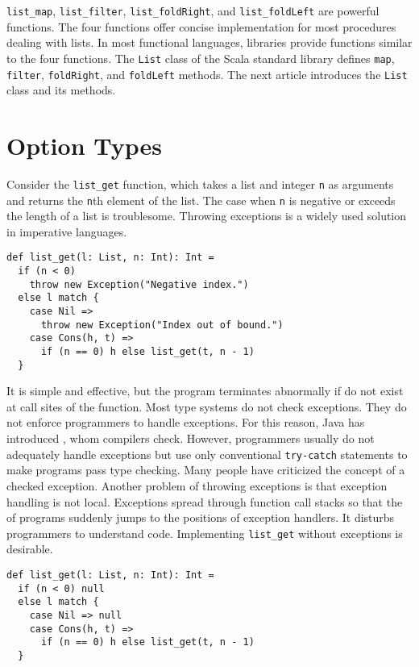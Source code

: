 \verb!list_map!, \verb!list_filter!, \verb!list_foldRight!, and
\verb!list_foldLeft! are powerful functions. The four functions offer concise
implementation for most procedures dealing with lists. In most functional
languages, libraries provide functions similar to the four functions. The
\verb!List! class of the Scala standard library defines \verb!map!,
\verb!filter!, \verb!foldRight!, and \verb!foldLeft! methods. The next article
introduces the \verb!List! class and its methods.

\section{Option Types}

Consider the \verb!list_get! function, which takes a list and integer \verb!n! as
arguments and returns the \verb!n!th element of the list. The case when \verb!n!
is negative or exceeds the length of a list is troublesome. Throwing exceptions
is a widely used solution in imperative languages.

\begin{verbatim}
def list_get(l: List, n: Int): Int =
  if (n < 0)
    throw new Exception("Negative index.")
  else l match {
    case Nil =>
      throw new Exception("Index out of bound.")
    case Cons(h, t) =>
      if (n == 0) h else list_get(t, n - 1)
  }
\end{verbatim}

It is simple and effective, but the program terminates abnormally if
 do not exist at call sites of the function. Most type
systems do not check exceptions. They do not enforce programmers to handle
exceptions. For this reason, Java has introduced , whom
compilers check. However, programmers usually do not adequately handle exceptions
but use only conventional \verb!try-catch! statements to make programs pass type
checking. Many people have criticized the concept of a checked exception. Another
problem of throwing exceptions is that exception handling is not local.
Exceptions spread through function call stacks so that the  of
programs suddenly jumps to the positions of exception handlers. It disturbs
programmers to understand code. Implementing \verb!list_get! without exceptions
is desirable.

\begin{verbatim}
def list_get(l: List, n: Int): Int =
  if (n < 0) null
  else l match {
    case Nil => null
    case Cons(h, t) =>
      if (n == 0) h else list_get(t, n - 1)
  }
\end{verbatim}

